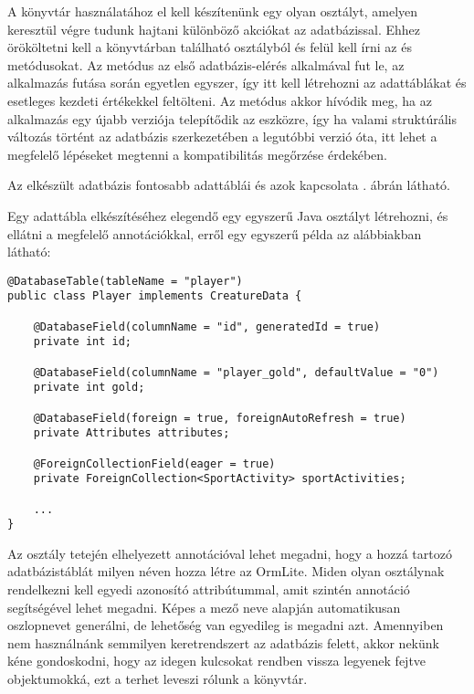 A könyvtár használatához el kell készítenünk egy olyan osztályt, amelyen keresztül végre tudunk hajtani különböző akciókat az adatbázissal. 
Ehhez örököltetni kell a könyvtárban található  osztályból és felül kell írni az  és  metódusokat.
Az  metódus az első adatbázis-elérés alkalmával fut le, az alkalmazás futása során egyetlen egyszer, így itt kell létrehozni az adattáblákat és esetleges kezdeti értékekkel feltölteni. 
Az  metódus akkor hívódik meg, ha az alkalmazás egy újabb verziója telepítődik az eszközre, így ha valami struktúrális változás történt az adatbázis szerkezetében a legutóbbi verzió óta, itt lehet a megfelelő lépéseket megtenni a kompatibilitás megőrzése érdekében. 

Az elkészült adatbázis fontosabb adattáblái és azok kapcsolata . ábrán látható. 


Egy adattábla elkészítéséhez elegendő egy egyszerű Java osztályt létrehozni, és ellátni a megfelelő annotációkkal, erről egy egyszerű példa az alábbiakban látható:

\begin{lstlisting}
@DatabaseTable(tableName = "player")
public class Player implements CreatureData {

    @DatabaseField(columnName = "id", generatedId = true)
    private int id;

    @DatabaseField(columnName = "player_gold", defaultValue = "0")
    private int gold;

    @DatabaseField(foreign = true, foreignAutoRefresh = true)
    private Attributes attributes;

    @ForeignCollectionField(eager = true)
    private ForeignCollection<SportActivity> sportActivities;

    ...
}
\end{lstlisting}

Az osztály tetején elhelyezett  annotációval lehet megadni, hogy a hozzá tartozó adatbázistáblát milyen néven hozza létre az OrmLite. 
Miden olyan osztálynak rendelkezni kell egyedi azonosító attribútummal, amit szintén annotáció segítségével lehet megadni. 
Képes a mező neve alapján automatikusan oszlopnevet generálni, de lehetőség van egyedileg is megadni azt. 
Amennyiben nem használnánk semmilyen keretrendszert az adatbázis felett, akkor nekünk kéne gondoskodni, hogy az idegen kulcsokat rendben vissza legyenek fejtve objektumokká, ezt a terhet leveszi rólunk a könyvtár. 

